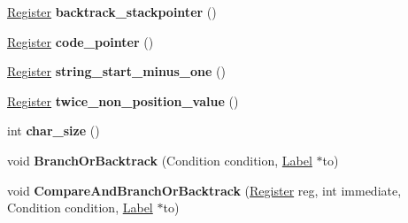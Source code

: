 \begin{DoxyCompactItemize}
\item 
\hyperlink{structv8_1_1internal_1_1_register}{Register} {\bfseries backtrack\+\_\+stackpointer} ()\hypertarget{classv8_1_1internal_1_1_reg_exp_macro_assembler_a_r_m64_a43d65517c15a339ed02fdb6e888a4081}{}\label{classv8_1_1internal_1_1_reg_exp_macro_assembler_a_r_m64_a43d65517c15a339ed02fdb6e888a4081}

\item 
\hyperlink{structv8_1_1internal_1_1_register}{Register} {\bfseries code\+\_\+pointer} ()\hypertarget{classv8_1_1internal_1_1_reg_exp_macro_assembler_a_r_m64_a236c627e80c84b022ee0c9ecec79f237}{}\label{classv8_1_1internal_1_1_reg_exp_macro_assembler_a_r_m64_a236c627e80c84b022ee0c9ecec79f237}

\item 
\hyperlink{structv8_1_1internal_1_1_register}{Register} {\bfseries string\+\_\+start\+\_\+minus\+\_\+one} ()\hypertarget{classv8_1_1internal_1_1_reg_exp_macro_assembler_a_r_m64_a0e6aac98dcffbbf277a7b9e7b27981c8}{}\label{classv8_1_1internal_1_1_reg_exp_macro_assembler_a_r_m64_a0e6aac98dcffbbf277a7b9e7b27981c8}

\item 
\hyperlink{structv8_1_1internal_1_1_register}{Register} {\bfseries twice\+\_\+non\+\_\+position\+\_\+value} ()\hypertarget{classv8_1_1internal_1_1_reg_exp_macro_assembler_a_r_m64_ad50b46d9896a1691bbbd75d30ddcd8a4}{}\label{classv8_1_1internal_1_1_reg_exp_macro_assembler_a_r_m64_ad50b46d9896a1691bbbd75d30ddcd8a4}

\item 
int {\bfseries char\+\_\+size} ()\hypertarget{classv8_1_1internal_1_1_reg_exp_macro_assembler_a_r_m64_a7d982701174888f56010856af57ebac7}{}\label{classv8_1_1internal_1_1_reg_exp_macro_assembler_a_r_m64_a7d982701174888f56010856af57ebac7}

\item 
void {\bfseries Branch\+Or\+Backtrack} (Condition condition, \hyperlink{classv8_1_1internal_1_1_label}{Label} $\ast$to)\hypertarget{classv8_1_1internal_1_1_reg_exp_macro_assembler_a_r_m64_aeda6ba6a16bb5515b4fd510f4939b7de}{}\label{classv8_1_1internal_1_1_reg_exp_macro_assembler_a_r_m64_aeda6ba6a16bb5515b4fd510f4939b7de}

\item 
void {\bfseries Compare\+And\+Branch\+Or\+Backtrack} (\hyperlink{structv8_1_1internal_1_1_register}{Register} reg, int immediate, Condition condition, \hyperlink{classv8_1_1internal_1_1_label}{Label} $\ast$to)\hypertarget{classv8_1_1internal_1_1_reg_exp_macro_assembler_a_r_m64_ae49971a085645dd58b1bd7a287440bc9}{}\label{classv8_1_1internal_1_1_reg_exp_macro_assembler_a_r_m64_ae49971a085645dd58b1bd7a287440bc9}


\end{DoxyCompactItemize}

